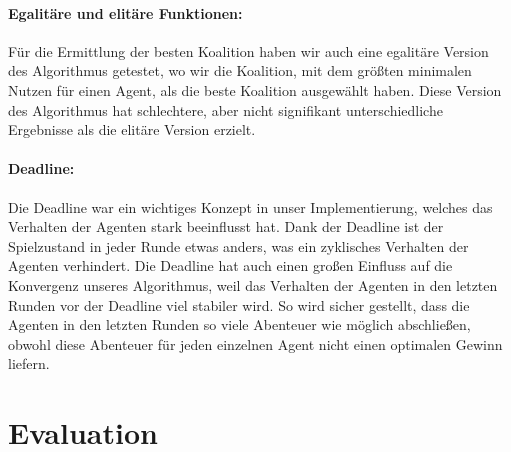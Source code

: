 \documentclass[fleqn,10pt]{SelfArx} %
\begin{document}
\paragraph{Egalitäre und elitäre Funktionen:} Für die Ermittlung der besten Koalition haben wir auch eine egalitäre Version des Algorithmus getestet, wo wir die Koalition, mit dem größten minimalen Nutzen für einen Agent, als die beste Koalition ausgewählt haben. Diese Version des Algorithmus hat schlechtere, aber nicht signifikant unterschiedliche Ergebnisse als die elitäre Version erzielt.


\paragraph{Deadline:}
Die Deadline war ein wichtiges Konzept in unser Implementierung, welches das Verhalten der Agenten stark beeinflusst hat. Dank der Deadline ist der Spielzustand in jeder Runde etwas anders, was ein zyklisches Verhalten der Agenten verhindert. Die Deadline hat auch einen großen Einfluss auf die Konvergenz unseres Algorithmus, weil das Verhalten der Agenten in den letzten Runden vor der Deadline viel stabiler wird. So wird sicher gestellt, dass die Agenten in den letzten Runden so viele Abenteuer wie möglich abschließen, obwohl diese Abenteuer für jeden einzelnen Agent nicht einen optimalen Gewinn liefern.

\section{Evaluation}
\label{sec:Evaluation}
\end{document}
